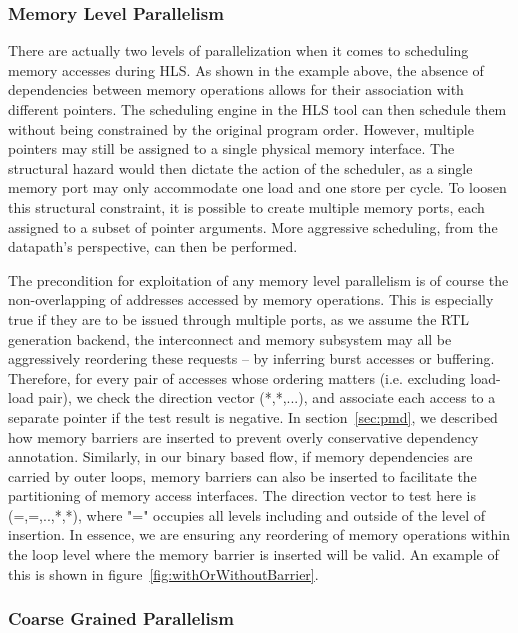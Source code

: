 \subsubsection{Memory Level Parallelism}
There are actually two levels of parallelization when it comes to scheduling memory accesses during HLS. As shown in the example above, the absence of dependencies between memory operations allows for their association with
different pointers. The scheduling engine in the HLS tool can then schedule
them without being constrained by the original program order. However, multiple pointers may still be assigned to a single physical memory  interface. The structural hazard would then dictate the action of the scheduler,
as a single memory port may only accommodate one load and one store per cycle.
To loosen this structural constraint, it is possible to create multiple memory
ports, each assigned to a subset of pointer arguments. More aggressive scheduling, from the datapath's perspective, can then be performed. 


The precondition for exploitation of any memory level parallelism is of course the non-overlapping of addresses accessed by memory operations. This is especially true if they are to be issued through multiple ports, 
as we assume the RTL generation backend, the interconnect and memory subsystem may all be aggressively reordering these requests -- by inferring burst accesses or buffering. Therefore, for every pair of accesses whose ordering matters (i.e. excluding load-load pair), we check the direction vector (*,*,...), and associate each access to a separate
pointer if the test result is negative. In section~\ref{sec:pmd}, we described how memory barriers are inserted to prevent overly conservative dependency annotation.
Similarly, in our binary based flow, if memory dependencies are carried by outer loops,
memory barriers can also be inserted to facilitate the partitioning of memory access interfaces. The direction vector to test here is  (=,=,..,*,*),
where "=" occupies all levels including and outside of the level of insertion. In essence, we are ensuring any reordering of memory operations within the loop level where the memory barrier is inserted will be valid. An example of this is shown in figure~\ref{fig:withOrWithoutBarrier}. 

\subsubsection{Coarse Grained Parallelism}


